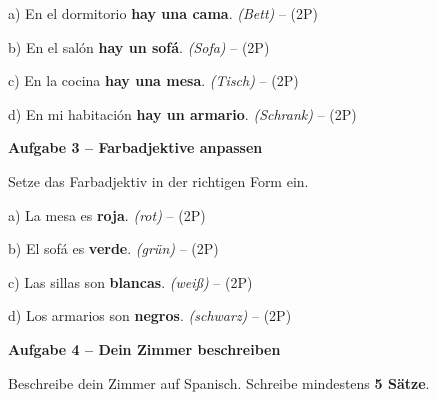 \documentclass[11pt, a4paper]{article}
\newcommand{\fachfarbe}{spanisch}
\newcommand{\punktebox}[1]{\hfill\fbox{\small \_/#1}}
\newcommand{\lsg}[1]{\textcolor{loesung}{\textbf{#1}}}
\newenvironment{aufgabe}[1]{%
    \needspace{5\baselineskip}%
    \nopagebreak[4]%
    \vspace{10pt}
    \noindent\textbf{\textcolor{\fachfarbe}{Aufgabe #1}}
    \nopagebreak[4]%
    \vspace{5pt}
    \nopagebreak[4]%
    \begin{list}{}{\leftmargin=0pt}
    \item[]
}{%
    \end{list}
}
\begin{document}
\noindent
a) En el dormitorio \lsg{hay una cama}. \hfill \textit{(Bett)} -- (2P)

\vspace{0.8em}

\noindent
b) En el salón \lsg{hay un sofá}. \hfill \textit{(Sofa)} -- (2P)

\vspace{0.8em}

\noindent
c) En la cocina \lsg{hay una mesa}. \hfill \textit{(Tisch)} -- (2P)

\vspace{0.8em}

\noindent
d) En mi habitación \lsg{hay un armario}. \hfill \textit{(Schrank)} -- (2P)

\vspace{15pt}


\begin{aufgabe}{3 -- Farbadjektive anpassen}
Setze das Farbadjektiv in der richtigen Form ein. \punktebox{8}
\end{aufgabe}

\noindent
a) La mesa es \lsg{roja}. \hfill \textit{(rot)} -- (2P)

\vspace{0.8em}

\noindent
b) El sofá es \lsg{verde}. \hfill \textit{(grün)} -- (2P)

\vspace{0.8em}

\noindent
c) Las sillas son \lsg{blancas}. \hfill \textit{(weiß)} -- (2P)

\vspace{0.8em}

\noindent
d) Los armarios son \lsg{negros}. \hfill \textit{(schwarz)} -- (2P)

\vspace{15pt}


\begin{aufgabe}{4 -- Dein Zimmer beschreiben}
Beschreibe dein Zimmer auf Spanisch. Schreibe mindestens \textbf{5 Sätze}. \punktebox{10}
\end{aufgabe}
\end{document}
